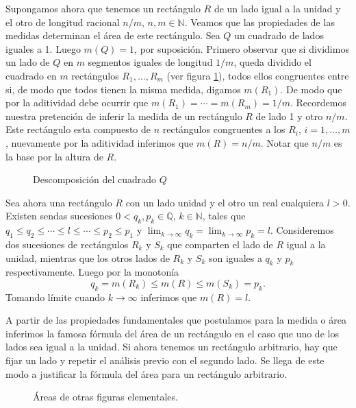 Supongamos ahora que tenemos un rectángulo $R$ de un lado igual a la unidad y el otro de longitud racional $n/m$, $n,m\in\mathbb{N}$. Veamos que las propiedades de las medidas determinan el área de este rectángulo. Sea $Q$ un cuadrado de lados iguales a 1. Luego $m(Q)=1$, por suposición.  Primero observar que si dividimos un lado de $Q$ en $m$ segmentos iguales de longitud $1/m$, queda dividido el cuadrado en $m$ rectángulos $R_1,\ldots,R_m$ (ver figura \ref{fig:desc_cuad}), todos ellos  congruentes entre si, de modo que todos tienen la misma medida, digamos $m(R_1)$.  De modo que por la aditividad debe ocurrir que $m(R_1)=\cdots =m(R_m)=1/m$. Recordemos nuestra pretención de inferir la medida de un rectángulo $R$ de lado 1 y otro $n/m$. Este rectángulo esta compuesto de $n$ rectángulos congruentes a los $R_i$, $i=1,\ldots,m$, nuevamente por la aditividad inferimos que $m(R)=n/m$. Notar que $n/m$ es la base por la altura de $R$.
 \begin{figure}[h]
 \centering
   
   
\caption{Descomposición del cuadrado $Q$}\label{fig:desc_cuad}
 \end{figure}
Sea ahora una rectángulo $R$ con un lado unidad y el otro un real cualquiera $l>0$. Existen sendas sucesiones $0<q_k,p_k\in\mathbb{Q}$, $k\in\mathbb{N}$, tales que $q_1\leq q_2\leq\cdots \leq l \leq \cdots\leq p_2\leq p_1$ y $\lim_{k\to\infty}q_k =\lim_{k\to\infty} p_k=l$. Consideremos   dos sucesiones de rectángulos $R_k$ y $S_k$ que comparten el lado de $R$ igual a la unidad, mientras que los otros lados de $R_k$ y $S_k$ son iguales a $q_k$ y $p_k$ respectivamente. Luego por la monotonía
\[
 q_k=m(R_k)\leq m(R) \leq m(S_k)= p_k.
\]
Tomando límite cuando $k\to\infty$ inferimos que $m(R)=l$. 




 
A partir de las propiedades fundamentales que postulamos para la medida o área inferimos la famosa fórmula del área de un rectángulo en el caso que uno de los lados sea igual a la unidad. Si ahora tenemos un rectángulo arbitrario, hay que fijar un lado y repetir el análisis previo con el segundo lado. Se llega de este modo a justificar la fórmula del área para un  rectángulo arbitrario. 


\begin{figure}[h]
 \begin{center}
  
 \end{center}
 \caption{Áreas de otras figuras elementales.}\label{fig:paral-trig}
\end{figure}

